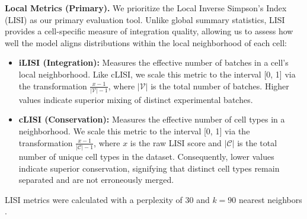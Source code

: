 \documentclass[unnumsec,webpdf,contemporary,large]{oup-authoring-template}%
\theoremstyle{thmstyleone}%
\theoremstyle{thmstyletwo}%
\theoremstyle{thmstylethree}%
\begin{document}
\textbf{Local Metrics (Primary).} We prioritize the Local Inverse Simpson's Index (LISI) \citep{Korsunsky2019-kj} as our primary evaluation tool. Unlike global summary statistics, LISI provides a cell-specific measure of integration quality, allowing us to assess how well the model aligns distributions within the local neighborhood of each cell:

\begin{itemize}
    \item \textbf{iLISI (Integration):} Measures the effective number of batches in a cell's local neighborhood. Like cLISI, we scale this metric to the interval [0, 1] via the transformation $\frac{x - 1}{\lvert \mathcal{V} \rvert - 1}$, where $\lvert \mathcal{V} \rvert$ is the total number of batches. Higher values indicate superior mixing of distinct experimental batches.
    \item \textbf{cLISI (Conservation):} Measures the effective number of cell types in a neighborhood. We scale this metric to the interval [0, 1] via the transformation $\frac{x - 1}{\lvert \mathcal{C} \rvert - 1}$, where $x$ is the raw LISI score and $\lvert \mathcal{C} \rvert$ is the total number of unique cell types in the dataset. Consequently, lower values indicate superior conservation, signifying that distinct cell types remain separated and are not erroneously merged.
\end{itemize}

LISI metrics were calculated with a perplexity of 30 and $k=90$ nearest neighbors \citep{Korsunsky2019-kj}.
\end{document}
